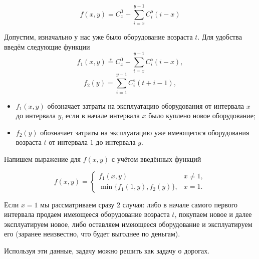 \[
\boxed{ f(x,y) = C_x^0 + \sum_{i=x}^{y-1} C_i^\text{э} (i-x)}\tag{*}
\]

Допустим, изначально у нас уже было оборудование возраста $t$. Для удобства введём следующие функции
\[
f_1(x, y) \stackrel{*}{=} C_x^0 + \sum_{i=x}^{y-1} C_i^\text{э} (i-x),
\]
\[
f_2(y) = \sum\limits_{i=1}^{y-1} C_i^\text{э} (t + i- 1),
\]

\begin{itemize}[nosep]
	\item $f_1(x, y)$ обозначает затраты на эксплуатацию оборудования от интервала $x$ до интервала $y$, если в начале интервала $x$ было куплено новое оборудование;
	
	\item $f_2(y)$ обозначает затраты на эксплуатацию уже имеющегося оборудования возраста $t$ от интервала $1$ до интервала $y$.
\end{itemize}

Напишем выражение для $f(x, y)$ с учётом введённых функций

\[
\boxed{f(x,y) = \begin{cases}
		f_1(x, y) & x \neq 1, \\
		\min\big\{f_1(1, y), f_2(y)\big\}, & x = 1.
	\end{cases}}
\]

Если $x = 1$ мы рассматриваем сразу 2 случая: либо в начале самого первого интервала продаем имеющееся оборудование возраста $t$, покупаем новое и далее эксплуатируем новое, либо оставляем имеющееся оборудование и эксплуатируем его (заранее неизвестно, что будет выгоднее по деньгам).

Используя эти данные, задачу можно решить как задачу о дорогах.
